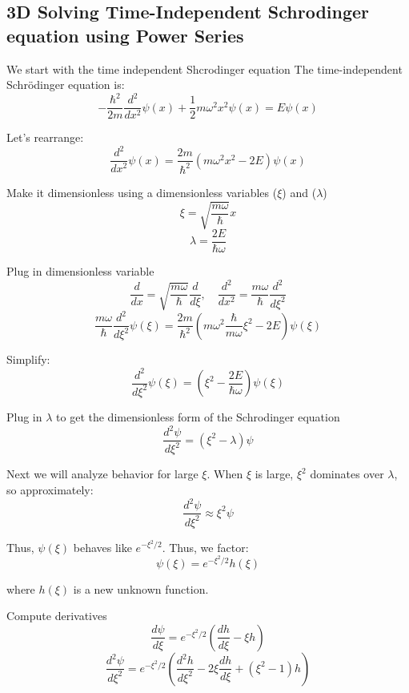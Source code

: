 \documentclass[12pt]{article}
\begin{document}
    \subsection{3D Solving Time-Independent Schrodinger equation using Power Series} \label{sec: 3DTISE}
        We start with the time independent Shcrodinger equation
        The time-independent Schrödinger equation is:
        \[
            -\frac{\hbar^2}{2m} \frac{d^2}{dx^2}\psi(x) + \frac{1}{2}m\omega^2 x^2 \psi(x) = E \psi(x)
        \]

        Let's rearrange:
        \[
            \frac{d^2}{dx^2}\psi(x) = \frac{2m}{\hbar^2} \left( m\omega^2 x^2 - 2E \right) \psi(x)
        \]

        Make it dimensionless using a dimensionless variables ($\xi$) and ($\lambda$)
        \[
            \xi = \sqrt{\frac{m\omega}{\hbar}}x
        \]
        \[
            \lambda = \frac{2E}{\hbar \omega}
        \]
        
        Plug in dimensionless variable
        \[
            \frac{d}{dx} = \sqrt{\frac{m\omega}{\hbar}} \frac{d}{d\xi}, \quad \frac{d^2}{dx^2} = \frac{m\omega}{\hbar} \frac{d^2}{d\xi^2}
        \]
        \[
            \frac{m\omega}{\hbar} \frac{d^2}{d\xi^2} \psi(\xi) = \frac{2m}{\hbar^2}\left( m\omega^2 \frac{\hbar}{m\omega} \xi^2 - 2E \right) \psi(\xi)
        \]

        Simplify:
        \[
            \frac{d^2}{d\xi^2} \psi(\xi) = \left( \xi^2 - \frac{2E}{\hbar \omega} \right) \psi(\xi)
        \]

        Plug in $\lambda$ to get the dimensionless form of the Schrodinger equation
        \begin{equation} \label{eq: ds}
            \frac{d^2 \psi}{d\xi^2} = \left( \xi^2 - \lambda \right) \psi 
        \end{equation}
            
        Next we will analyze behavior for large \( \xi \). When \( \xi \) is large, \( \xi^2 \) dominates over \( \lambda \), so approximately:
        \[
            \frac{d^2 \psi}{d\xi^2} \approx \xi^2 \psi
        \]

        Thus, \( \psi(\xi) \) behaves like \( e^{-\xi^2/2} \). Thus, we factor:
        \[
            \psi(\xi) = e^{-\xi^2/2} h(\xi)
        \]

        where \( h(\xi) \) is a new unknown function.

        Compute derivatives
        \[
            \frac{d\psi}{d\xi} = e^{-\xi^2/2} \left( \frac{dh}{d\xi} - \xi h \right)
        \]
        \[
            \frac{d^2\psi}{d\xi^2} = e^{-\xi^2/2} \left( \frac{d^2 h}{d\xi^2} - 2\xi \frac{dh}{d\xi} + (\xi^2 - 1)h \right)
        \]
\end{document}
